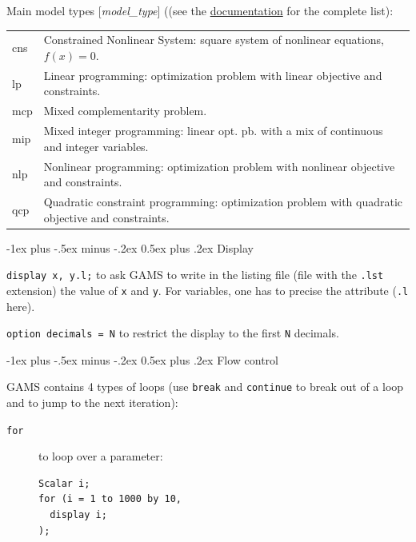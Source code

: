 \documentclass[10pt,landscape,a4paper]{article}
\makeatletter
\renewcommand{\section}{\@startsection{section}{1}{0mm}%
                                {-1ex plus -.5ex minus -.2ex}%
                                {0.5ex plus .2ex}%
                                {\color{blue}\normalfont\large\bfseries}}
\makeatother
\begin{document}
\begin{multicols}{2}
Main model types [\emph{model\_type}] ((see the
\href{https://www.gams.com/latest/docs/UG_ModelSolve.html#UG_ModelSolve_ModelClassificationOfModels}{documentation}
for the complete list):\\
\begin{tabularx}{\columnwidth}{@{}>{\ttfamily}lX@{}}
cns  & Constrained Nonlinear System: square system of nonlinear
equations, $f\left(x\right)=0$.\\
lp  & Linear programming: optimization problem with linear objective and constraints.\\
mcp  & Mixed complementarity problem.\\
mip & Mixed integer programming: linear opt. pb. with a mix of
continuous and integer variables.\\
nlp  & Nonlinear programming: optimization problem with nonlinear
objective and constraints.\\
qcp  & Quadratic constraint programming: optimization problem with
quadratic objective and constraints.
\end{tabularx}

\section{Display}

\verb!display x, y.l;! to ask GAMS to write in the listing file (file with the
\texttt{.lst} extension) the value of \verb!x!  and \verb!y!. For variables, one
has to precise the attribute (\verb!.l! here).

\verb!option decimals = N! to restrict the display to the first \verb!N!
decimals.

\section{Flow control}

GAMS contains 4 types of loops (use \texttt{break} and \texttt{continue} to break out of a loop and to jump to the next iteration):
\begin{description}
\item[\texttt{for}] to loop over a parameter:\\
\begin{multicols}{2}
\begin{verbatim}
Scalar i;
for (i = 1 to 1000 by 10,
  display i;
);
\end{verbatim}
  \columnbreak
\begin{verbatim}


\end{verbatim}
\end{multicols}
\end{description}
\end{multicols}
\end{document}
